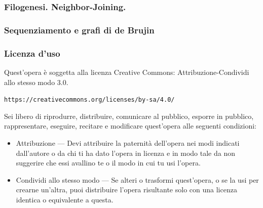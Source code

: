 \begin{frame}[fragile]
\frametitle{Filogenesi. Neighbor-Joining.}
\end{frame}


\begin{frame}[fragile]
\frametitle{Sequenziamento e grafi di de Brujin}
\end{frame}



\begin{frame}[containsverbatim]\frametitle{Licenza d'uso}
  \small

  Quest'opera {\`e} soggetta alla licenza Creative Commons: Attribuzione-Condividi
  allo stesso modo 3.0.

  \verb+https://creativecommons.org/licenses/by-sa/4.0/+

  Sei libero di riprodurre, distribuire, comunicare al pubblico, esporre in
  pubblico, rappresentare, eseguire, recitare e modificare quest'opera
  alle seguenti condizioni:
  \begin{itemize}
  \item
    Attribuzione — Devi attribuire la paternit{\`a} dell'opera nei modi indicati
    dall'autore o da chi ti ha dato l'opera in licenza e in modo tale da non
    suggerire che essi avallino te o il modo in cui tu usi l'opera.
  \item
    Condividi allo stesso modo — Se alteri o trasformi quest'opera, o se la usi
    per crearne un'altra, puoi distribuire l'opera risultante solo con una licenza
    identica o equivalente a  questa.
  \end{itemize}
  \vspace*{1cm}
\end{frame}






